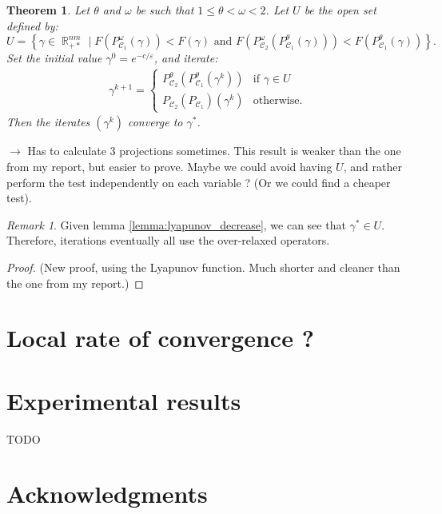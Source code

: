 \documentclass{article} %
\DeclareMathOperator{\IR}{\mathbb{R}}
\DeclareMathOperator{\Ccal}{\mathcal{C}}
\renewcommand{\epsilon}{\varepsilon}
\theoremstyle{plain}
\newtheorem{theorem}{Theorem}
\theoremstyle{definition}
\theoremstyle{remark}
\newtheorem{remark}{Remark}
\begin{document}
\begin{theorem}
	Let $\theta$ and $\omega$ be such that $1\le \theta < \omega < 2$. Let $U$ be the open set defined by:
	\begin{equation}\label{eq:open_set_U}
	U = \left\{
	\gamma \in \IR_{+*}^{nm} \mid
	F(P^\omega_{\Ccal_1}(\gamma)) < F(\gamma)
	\text{ and }
	F(P^\omega_{\Ccal_2}(P^\theta_{\Ccal_1}(\gamma))) < F(P^\theta_{\Ccal_1}(\gamma))
	\right\}.
	\end{equation}
	Set the initial value $\gamma^0 = e^{-c/\epsilon}$, and iterate:
	\begin{align*}
	\gamma^{k+1} =
	\begin{cases}
	P^\theta_{\Ccal_2}(P^\theta_{\Ccal_1}(\gamma^k)) & \text{if } \gamma \in U \\
	P_{\Ccal_2}(P_{\Ccal_1})(\gamma^k) & \text{otherwise.}
	\end{cases}
	\end{align*}
	Then the iterates $(\gamma^k)$ converge to $\gamma^*$.
\end{theorem}
{\color{red} $\longrightarrow$ Has to calculate 3 projections sometimes. This result is weaker than the one from my report, but easier to prove. Maybe we could avoid having $U$, and rather perform the test independently on each variable ? (Or we could find a cheaper test).}
\begin{remark}
	Given lemma \ref{lemma:lyapunov_decrease}, we can see that $\gamma^* \in U$. Therefore, iterations eventually all use the over-relaxed operators.
\end{remark}

\begin{proof}
	(New proof, using the Lyapunov function. Much shorter and cleaner than the one from my report.)
\end{proof}


\section{Local rate of convergence ?}

\section{Experimental results}
{\color{red} TODO}


\section*{Acknowledgments}





\end{document}
